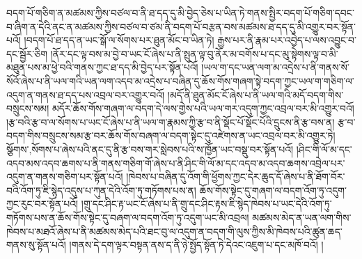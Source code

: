 བདག་པོ་གཅིག་ན་མཚམས་ཀྱིས་བཙལ་བ་ནི་ཐ་དད་དུ་མི་བྱེད་ཅེས་པ་ཡིན་ཏེ་གནས་སྤྱིར་བདག་པོ་གཅིག་དབང་བ་ཞིག་ན་དེའི་ནང་ན་མཚམས་ཀྱིས་བཙལ་བ་ཙམ་ནི་བདག་པོ་བརྩན་བས་མཚམས་ཐ་དད་དུ་མི་འགྱུར་བར་སྟོན་པའོ། །བདག་པོ་ཐ་དད་ན་ཡང་སྒོ་ལ་སོགས་པར་ཐུན་མོང་བ་ཡིན་ཏེ། རྒྱས་པར་ནི་རྣམ་པར་འབྱེད་པ་ལས་འབྱུང་བ་དང་སྦྱོར་ཅིག །ནོར་དང་ལྟ་བས་མ་བྱེ་བ་ཡང་ངོ་ཞེས་པ་ནི་སྤུན་ལྟ་བུ་ནོར་མ་བགོས་པ་དང་མུ་སྟེགས་ལྟ་བ་མི་མཐུན་པས་མ་ཕྱེ་བའི་གནས་ཀྱང་ཐ་དད་མི་བྱེད་པར་སྟོན་པའོ། །ཡལ་ག་དང་ཡན་ལག་མ་འདྲེས་པ་ནི་གནས་སོ་སོའོ་ཞེས་པ་ནི་ཡལ་གའི་ཡན་ལག་འདབ་མ་འདྲེས་པ་བཞིན་དུ་ཆོས་གོས་གཞག་སྟེ་བདག་ཀྱང་ཡལ་ག་གཅིག་ལ་འདུག་ན་གནས་ཐ་དད་པས་འབྲལ་བར་འགྱུར་བའོ། །མདོ་ནི་ཐུན་མོང་ངོ་ཞེས་པ་ནི་ཡལ་གའི་མདོ་བདག་གིས་བསྲུངས་སམ། མདོར་ཆོས་གོས་གཞག་ལ་བདག་དེ་ལས་གྱེས་པའི་ཡལ་གར་འདུག་ཀྱང་འབྲལ་བར་མི་འགྱུར་བའོ། །རྩ་བའི་རྩ་བ་ལ་སོགས་པ་ཡང་ངོ་ཞེས་པ་ནི་ཡལ་ག་རྣམས་ཀྱི་རྩ་བ་ནི་སྡོང་པོ་སྡོང་པོའི་དྲུངས་ནི་རྩ་བས་ན། རྩ་བ་བདག་གིས་བསྲུངས་སམ་རྩ་བར་ཆོས་གོས་བཞག་ལ་བདག་སྟེང་དུ་འཛེགས་ན་ཡང་འབྲལ་བར་མི་འགྱུར་ཏེ། {སྩོགས་,སོགས་}པ་ཞེས་པའི་ནང་དུ་ནི་རྩ་བས་གར་སླེབས་པའི་ས་ཁྱོན་ཡང་བསྡུ་བར་སྟོན་པའོ། །ཤིང་གི་ལོ་མ་དང་འདབ་མས་འདབ་ཆགས་པ་ནི་གནས་གཅིག་གོ་ཞེས་པ་ནི་ཤིང་གི་ལོ་མ་དང་འདབ་མ་འདབ་ཆགས་འབྲེལ་པར་འདུག་ན་གནས་གཅིག་པར་སྟོན་པའོ། །ཁེབས་པ་བཞིན་དུ་འོག་གི་ཕྱོགས་ཀྱང་དེར་ཆུད་དོ་ཞེས་པ་ནི་ཐོག་བོར་བའི་འོག་ཏུ་ཇི་སྙེད་འདུས་པ་ཀུན་དེའི་འོག་ཏུ་གཏོགས་པས་ན། ཆོས་གོས་སྟེང་དུ་གཞག་ལ་བདག་འོག་ཏུ་འདུག་ཀྱང་རུང་བར་སྟོན་པའོ། །གྲུ་དང་ཤིང་རྟ་ཡང་ངོ་ཞེས་པ་ནི་གྲུ་དང་ཤིང་རྟས་ཇི་སྙེད་ཁེབས་པ་ཡང་དེའི་འོག་ཏུ་གཏོགས་པས་ན་ཆོས་གོས་སྟེང་དུ་བཞག་ལ་བདག་འོག་ཏུ་འདུག་ཡང་མི་འབྲལ། མཚམས་མེད་ན་ཡན་ལག་གིས་ཁེབས་པ་མཐའོ་ཞེས་པ་ནི་མཚམས་མེད་པའི་ཐང་བུ་ལ་འདུག་ན་བདག་གི་ལུས་ཀྱིས་མི་ཁེབས་པའི་ཚུན་ཆད་གནས་སུ་སྟོན་པའོ། །གནས་དེ་དག་ལྟར་བསྟན་ནས་ད་ནི་ཉེ་སྤྱོད་སྟོན་ཏེ་དེའང་འཇུག་པ་དང་མཁོ་བའོ། །
